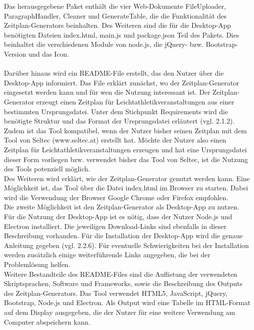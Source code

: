 Das herausgegebene Paket enthält die vier Web-Dokumente FileUploader, ParagraphHandler, Cleaner und GenerateTable, die die Funktionalität des Zeitplan-Generators beinhalten. Des Weiteren sind die für die Desktop-App benötigten Dateien index.html, main.js und package.json Teil des Pakets. Dies beinhaltet die verschiedenen Module von node.js, die jQuery- bzw. Bootstrap-Version und das Icon. \\
\\
Darüber hinaus wird ein README-File erstellt, das den Nutzer über die Desktop-App informiert. Das File erklärt zunächst, wo der Zeitplan-Generator eingesetzt werden kann und für wen die Nutzung interessant ist. Der Zeitplan-Generator erzeugt einen Zeitplan für Leichtathletikveranstaltungen aus einer bestimmten Ursprungsdatei. Unter dem Stichpunkt Requirements wird die benötigte Struktur und das Format der Ursprungsdatei erläutert (vgl. 2.1.2). Zudem ist das Tool kompatibel, wenn der Nutzer bisher seinen Zeitplan mit dem Tool von Seltec (www.seltec.at) erstellt hat. Möchte der Nutzer also einen Zeitplan für Leichtathletikveranstaltungen erzeugen und hat eine Ursprungsdatei dieser Form vorliegen bzw. verwendet bisher das Tool von Seltec, ist die Nutzung des Tools potenziell möglich.\\
Des Weiteren wird erklärt, wie der Zeitplan-Generator genutzt werden kann. Eine Möglichkeit ist, das Tool über die Datei index.html im Browser zu starten. Dabei wird die Verwendung der Browser Google Chrome oder Firefox empfohlen. \\
Die zweite Möglichkeit ist den Zeitplan-Generator als Desktop-App zu nutzen. Für die Nutzung der Desktop-App ist es nötig, dass der Nutzer Node.js und Electron installiert. Die jeweiligen Download-Links sind ebenfalls in dieser Beschreibung vorhanden. Für die Installation der Desktop-App wird die genaue Anleitung gegeben (vgl. 2.2.6). Für eventuelle Schwierigkeiten bei der Installation werden zusätzlich einige weiterführende Links angegeben, die bei der Problemlösung helfen.\\
Weitere Bestandteile des README-Files sind die Auflistung der verwendeten Skriptsprachen, Software und Frameworks, sowie die Beschreibung des Outputs des Zeitplan-Generators. Das Tool verwendet HTML5, JavaScript, jQuery, Bootstrap, Node.js und Electron. Als Output wird eine Tabelle im HTML-Format auf dem Display ausgegeben, die der Nutzer für eine weitere Verwendung am Computer abspeichern kann.
